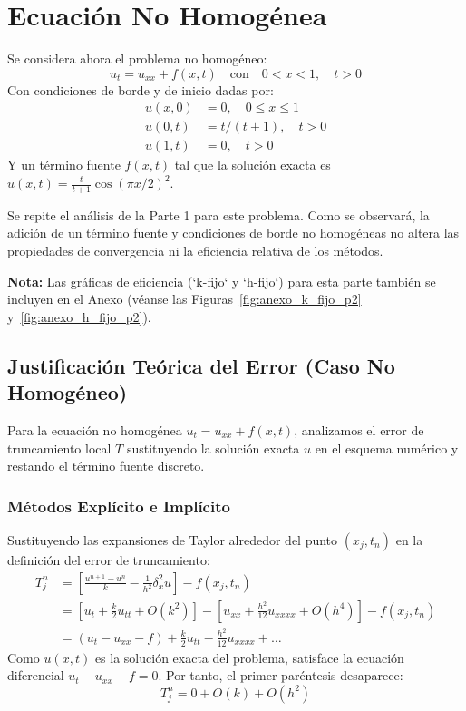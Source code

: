 \documentclass{article}
\begin{document}
\clearpage
\section{Ecuación No Homogénea}

\noindent Se considera ahora el problema no homogéneo:
\[
	u_t = u_{xx} + f(x,t)
	\quad \text{con} \quad
	0 < x < 1, \quad t > 0
\]
\noindent Con condiciones de borde y de inicio dadas por:
\begin{align}
	u(x,0) & = 0, \quad 0 \le x \le 1 \\
	u(0,t) & = t / (t+1), \quad t > 0 \\
	u(1,t) & = 0, \quad t > 0
\end{align}
\noindent Y un término fuente \(f(x,t)\) tal que la solución exacta es \(u(x,t) = \frac{t}{t+1}\cos(\pi x/2)^2\).

\noindent Se repite el análisis de la Parte 1 para este problema. Como se observará, la adición de un término fuente y condiciones de borde no homogéneas no altera las propiedades de convergencia ni la eficiencia relativa de los métodos.

\noindent \textbf{Nota:} Las gráficas de eficiencia (`k-fijo` y `h-fijo`) para esta parte también se incluyen en el Anexo (véanse las Figuras~\ref{fig:anexo_k_fijo_p2} y~\ref{fig:anexo_h_fijo_p2}).

\subsection{Justificación Teórica del Error (Caso No Homogéneo)}

Para la ecuación no homogénea \( u_t = u_{xx} + f(x,t) \), analizamos el error de truncamiento local \( T \) sustituyendo la solución exacta \( u \) en el esquema numérico y restando el término fuente discreto.

\subsubsection*{Métodos Explícito e Implícito}
Sustituyendo las expansiones de Taylor alrededor del punto \((x_j, t_n)\) en la definición del error de truncamiento:
\begin{align*}
	T_j^n & = \left[ \frac{u^{n+1} - u^n}{k} - \frac{1}{h^2}\delta_x^2 u \right] - f(x_j, t_n)                                        \\
	      & = \left[ u_t + \frac{k}{2}u_{tt} + O(k^2) \right] - \left[ u_{xx} + \frac{h^2}{12}u_{xxxx} + O(h^4) \right] - f(x_j, t_n) \\
	      & = \left( u_t - u_{xx} - f \right) + \frac{k}{2}u_{tt} - \frac{h^2}{12}u_{xxxx} + \dots
\end{align*}
Como \(u(x,t)\) es la solución exacta del problema, satisface la ecuación diferencial \( u_t - u_{xx} - f = 0 \). Por tanto, el primer paréntesis desaparece:
\[
	T_j^n = 0 + O(k) + O(h^2)
\]
\end{document}
